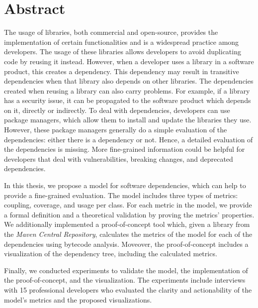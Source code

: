 \chapter*{Abstract}
The usage of libraries, both commercial and open-source, provides the implementation of certain functionalities and is a widespread practice among developers. The usage of these libraries allows developers to avoid duplicating code by reusing it instead. However, when a developer uses a library in a software product, this creates a dependency. This dependency may result in transitive
dependencies when that library also depends on other libraries. The dependencies created when reusing a library can also carry problems. For example, if a library has a security issue, it can be propagated to the software product which depends on it, directly or indirectly. To deal with dependencies, developers can use package managers, which allow them to install and update the libraries they use. However, these package managers generally do a simple evaluation of the dependencies: either there is a dependency or not. Hence, a detailed evaluation of the dependencies is missing. More fine-grained information could be helpful for developers that deal with vulnerabilities, breaking changes, and deprecated dependencies.

In this thesis, we propose a model for software dependencies, which can help to provide a fine-grained evaluation. The model includes three types of metrics: coupling, coverage, and usage per class. For each metric in the model, we provide a formal definition and a theoretical validation by proving the metrics' properties. We additionally implemented a proof-of-concept tool which, given a library from the \textit{Maven Central Repository}, calculates the metrics of the model for each of the dependencies using bytecode analysis. Moveover, the proof-of-concept includes a visualization of the dependency tree, including the calculated metrics.

Finally, we conducted experiments to validate the model, the implementation of the proof-of-concept, and the visualization. The experiments include interviews with 15 professional developers who evaluated the clarity and actionability of the model’s metrics and the proposed visualizations.
